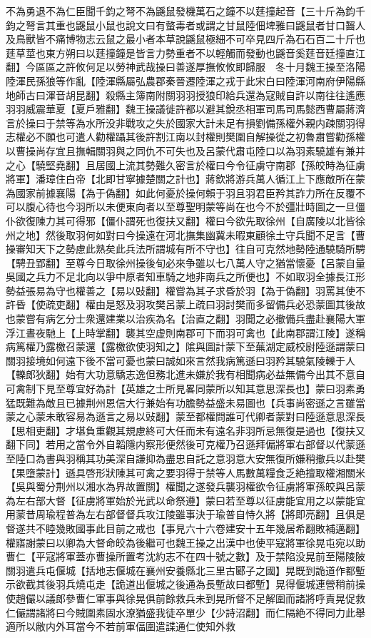 不為勇退不為仁臣聞千鈞之弩不為鼷鼠發機萬石之鐘不以莛撞起音【三十斤為鈞千鈞之弩言其重也鼷鼠小鼠也說文曰有螫毒者或謂之甘鼠陸佃埤雅曰鼷鼠者甘口齧人及鳥獸皆不痛博物志云鼠之最小者本草說鼷鼠極細不可卒見四斤為石石百二十斤也莛草莖也東方朔曰以莛撞鐘是皆言力勢重者不以輕觸而發動也鼷音奚莛音廷撞直江翻】今區區之許攸何足以勞神武哉操曰善遂厚撫攸攸即歸服　冬十月魏王操至洛陽　陸渾民孫狼等作亂【陸渾縣屬弘農郡秦晉遷陸渾之戎于此宋白曰陸渾河南府伊陽縣地師古曰渾音胡昆翻】殺縣主簿南附關羽羽授狼印給兵還為寇賊自許以南往往遙應羽羽威震華夏【夏戶雅翻】魏王操議徙許都以避其銳丞相軍司馬司馬懿西曹屬蔣濟言於操曰于禁等為水所没非戰攻之失於國家大計未足有損劉備孫權外親内疎關羽得志權必不願也可遣人勸權躡其後許割江南以封權則樊圍自解操從之初魯肅嘗勸孫權以曹操尚存宜且撫輯關羽與之同仇不可失也及呂蒙代肅屯陸口以為羽素驍雄有兼并之心【驍堅堯翻】且居國上流其勢難久密言於權曰今令征虜守南郡【孫皎時為征虜將軍】潘璋住白帝【北即甘寧據楚關之計也】蔣欽將游兵萬人循江上下應敵所在蒙為國家前據襄陽【為于偽翻】如此何憂於操何賴于羽且羽君臣矜其詐力所在反覆不可以腹心待也今羽所以未便東向者以至尊聖明蒙等尚在也今不於彊壯時圖之一旦僵仆欲復陳力其可得邪【僵仆謂死也復扶又翻】權曰今欲先取徐州【自廣陵以北皆徐州之地】然後取羽何如對曰今操遠在河北撫集幽冀未暇東顧徐土守兵聞不足言【曹操審知天下之勢慮此熟矣此兵法所謂城有所不守也】往自可克然地勢陸通驍騎所騁【騁丑郢翻】至尊今日取徐州操後旬必來争雖以七八萬人守之猶當懷憂【呂蒙自量吳國之兵力不足北向以爭中原者知車騎之地非南兵之所便也】不如取羽全據長江形勢益張易為守也權善之【易以䜴翻】權嘗為其子求昏於羽【為于偽翻】羽罵其使不許昏【使疏吏翻】權由是怒及羽攻樊呂蒙上疏曰羽討樊而多留備兵必恐蒙圖其後故也蒙嘗有病乞分士衆還建業以治疾為名【治直之翻】羽聞之必撤備兵盡赴襄陽大軍浮江晝夜馳上【上時掌翻】襲其空虚則南郡可下而羽可禽也【此南郡謂江陵】遂稱病篤權乃露檄召蒙還【露檄欲使羽知之】隂與圖計蒙下至蕪湖定威校尉陸遜謂蒙曰關羽接境如何遠下後不當可憂也蒙曰誠如來言然我病篤遜曰羽矜其驍氣陵轢于人【轢郎狄翻】始有大功意驕志逸但務北進未嫌於我有相聞病必益無備今出其不意自可禽制下見至尊宜好為計【英雄之士所見畧同蒙所以知其意思深長也】蒙曰羽素勇猛既難為敵且已據荆州恩信大行兼始有功膽勢益盛未易圖也【兵事尚密遜之言雖當蒙之心蒙未敢容易為遜言之易以䜴翻】蒙至都權問誰可代卿者蒙對曰陸遜意思深長【思相吏翻】才堪負重觀其規慮終可大任而未有遠名非羽所忌無復是過也【復扶又翻下同】若用之當令外自韜隱内察形便然後可克權乃召遜拜偏將軍右部督以代蒙遜至陸口為書與羽稱其功美深自謙抑為盡忠自託之意羽意大安無復所嫌稍撤兵以赴樊【果墮蒙計】遜具啓形狀陳其可禽之要羽得于禁等人馬數萬糧食乏絶擅取權湘關米【吳與蜀分荆州以湘水為界故置關】權聞之遂發兵襲羽權欲令征虜將軍孫皎與呂蒙為左右部大督【征虜將軍始於光武以命祭遵】蒙曰若至尊以征虜能宜用之以蒙能宜用蒙昔周瑜程普為左右部督督兵攻江陵雖事決于瑜普自恃久將【將即亮翻】且俱是督遂共不睦幾敗國事此目前之戒也【事見六十六卷建安十五年幾居希翻敗補邁翻】權寤謝蒙曰以卿為大督命皎為後繼可也魏王操之出漢中也使平寇將軍徐晃屯宛以助曹仁【平寇將軍蓋亦曹操所置考沈約志不在四十號之數】及于禁陷没晃前至陽陵陂關羽遣兵屯偃城【括地志偃城在襄州安養縣北三里古郾子之國】晃既到詭道作都塹示欲截其後羽兵燒屯走【詭道出偃城之後通為長塹故曰都塹】晃得偃城連營稍前操使趙儼以議郎參曹仁軍事與徐晃俱前餘救兵未到晃所督不足解圍而諸將呼責晃促救仁儼謂諸將曰今賊圍素固水潦猶盛我徒卒單少【少詩沼翻】而仁隔絶不得同力此舉適所以敝内外耳當今不若前軍偪圍遣諜通仁使知外救